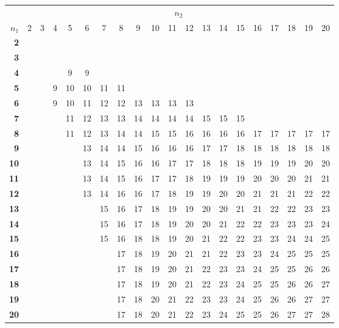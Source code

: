 \documentclass[12pt,a4paper]{article}
\begin{document}
\begin{center}
\footnotesize
\setlength{\tabcolsep}{2pt}
\begin{tabular*}{\linewidth}{@{\extracolsep{\fill}}rccccccccccccccccccc@{}}
\toprule
& \multicolumn{19}{c}{$n_2$} \\
$n_1$ & 2 & 3 & 4 & 5 & 6 & 7 & 8 & 9 & 10 & 11 & 12 & 13 & 14 & 15 & 16 & 17 & 18 & 19 & 20 \\
\midrule
\textbf{2} &  &  &  &  &  &  &  &  &  &  &  &  &  &  &  &  &  &  &  \\
\textbf{3} &  &  &  &  &  &  &  &  &  &  &  &  &  &  &  &  &  &  &  \\
\textbf{4} &  &  &  & 9 & 9 &  &  &  &  &  &  &  &  &  &  &  &  &  &  \\
\textbf{5} &  &  & 9 & 10 & 10 & 11 & 11 &  &  &  &  &  &  &  &  &  &  &  &  \\
\textbf{6} &  &  & 9 & 10 & 11 & 12 & 12 & 13 & 13 & 13 & 13 &  &  &  &  &  &  &  &  \\
\textbf{7} &  &  &  & 11 & 12 & 13 & 13 & 14 & 14 & 14 & 14 & 15 & 15 & 15 &  &  &  &  &  \\
\textbf{8} &  &  &  & 11 & 12 & 13 & 14 & 14 & 15 & 15 & 16 & 16 & 16 & 16 & 17 & 17 & 17 & 17 & 17 \\
\textbf{9} &  &  &  &  & 13 & 14 & 14 & 15 & 16 & 16 & 16 & 17 & 17 & 18 & 18 & 18 & 18 & 18 & 18 \\
\textbf{10} &  &  &  &  & 13 & 14 & 15 & 16 & 16 & 17 & 17 & 18 & 18 & 18 & 19 & 19 & 19 & 20 & 20 \\
\textbf{11} &  &  &  &  & 13 & 14 & 15 & 16 & 17 & 17 & 18 & 19 & 19 & 19 & 20 & 20 & 20 & 21 & 21 \\
\textbf{12} &  &  &  &  & 13 & 14 & 16 & 16 & 17 & 18 & 19 & 19 & 20 & 20 & 21 & 21 & 21 & 22 & 22 \\
\textbf{13} &  &  &  &  &  & 15 & 16 & 17 & 18 & 19 & 19 & 20 & 20 & 21 & 21 & 22 & 22 & 23 & 23 \\
\textbf{14} &  &  &  &  &  & 15 & 16 & 17 & 18 & 19 & 20 & 20 & 21 & 22 & 22 & 23 & 23 & 23 & 24 \\
\textbf{15} &  &  &  &  &  & 15 & 16 & 18 & 18 & 19 & 20 & 21 & 22 & 22 & 23 & 23 & 24 & 24 & 25 \\
\textbf{16} &  &  &  &  &  &  & 17 & 18 & 19 & 20 & 21 & 21 & 22 & 23 & 23 & 24 & 25 & 25 & 25 \\
\textbf{17} &  &  &  &  &  &  & 17 & 18 & 19 & 20 & 21 & 22 & 23 & 23 & 24 & 25 & 25 & 26 & 26 \\
\textbf{18} &  &  &  &  &  &  & 17 & 18 & 19 & 20 & 21 & 22 & 23 & 24 & 25 & 25 & 26 & 26 & 27 \\
\textbf{19} &  &  &  &  &  &  & 17 & 18 & 20 & 21 & 22 & 23 & 23 & 24 & 25 & 26 & 26 & 27 & 27 \\
\textbf{20} &  &  &  &  &  &  & 17 & 18 & 20 & 21 & 22 & 23 & 24 & 25 & 25 & 26 & 27 & 27 & 28 \\
\bottomrule
\end{tabular*}
\end{center}
\end{document}
